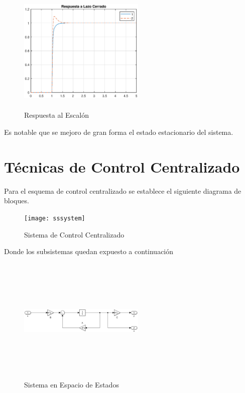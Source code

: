 \documentclass[journal,twoside,web]{ieeecolor}
\begin{document}
	\begin{figure}[h]
		\begin{center}
			\includegraphics[width=6cm,height=6cm,keepaspectratio]{clresponse}
			\caption{ Respuesta al Escalón  \label{clresponse}}
		\end{center}
	\end{figure}

	Es notable que se mejoro de gran forma el estado estacionario del  sistema.
	
	
	
	\newpage
\section{Técnicas de Control Centralizado}

	Para el esquema de control centralizado se establece el siguiente diagrama de bloques.


	\begin{figure}[h]
		\begin{center}
			\texttt{[image: sssystem]}
			\caption{ Sistema de Control Centralizado \label{sssystem}}
		\end{center}
	\end{figure}

	Donde los subsistemas quedan expuesto a continuación
	
	
	\begin{figure}[h]
		\begin{center}
			\includegraphics[width=6cm,height=6cm,keepaspectratio]{centralizadosistema}
			\caption{ Sistema en Espacio de Estados \label{centralizadosistema}}
		\end{center}
	\end{figure}
	
\end{document}
